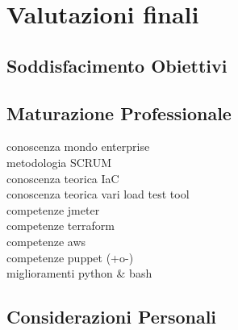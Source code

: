
\chapter{Valutazioni finali}
\label{cap:analisi-requisiti}
\section{Soddisfacimento Obiettivi}
\section{Maturazione Professionale}
conoscenza mondo enterprise \\
metodologia SCRUM \\
conoscenza teorica IaC \\
conoscenza teorica vari load test tool \\
competenze jmeter \\
competenze terraform \\
competenze aws \\
competenze puppet (+o-)\\
miglioramenti python \& bash
\section{Considerazioni Personali}